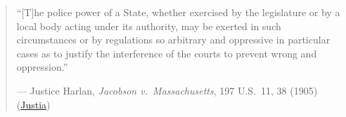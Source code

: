 \documentclass[12pt]{article}
\begin{document}
\begin{quote}
``[T]he police power of a State, whether exercised by the legislature or by a local body acting under its authority, may be exerted in such circumstances or by regulations so arbitrary and oppressive in particular cases as to justify the interference of the courts to prevent wrong and oppression.''
\begin{flushright}--- Justice Harlan, \textit{Jacobson v.\ Massachusetts}, 197 U.S.\ 11, 38 (1905) (\href{https://supreme.justia.com/cases/federal/us/197/11/}{Justia})\end{flushright}
\end{quote}
\end{document}
